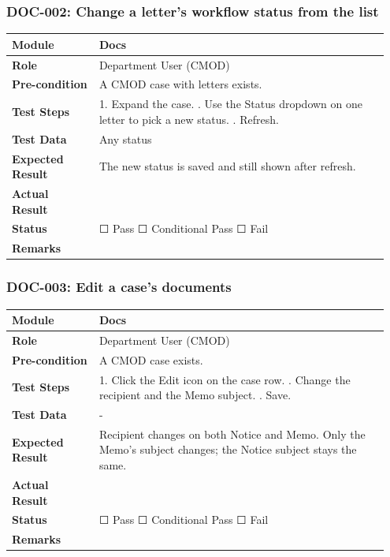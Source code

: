 \documentclass[10pt]{article}
\begin{document}
\subsubsection*{DOC-002: Change a letter's workflow status from the list}
\begin{longtable}{p{0.22\linewidth}p{0.73\linewidth}}
\hline
\textbf{Module} & Docs \\ \hline
\textbf{Role} & Department User (CMOD) \\ \hline
\textbf{Pre-condition} & A CMOD case with letters exists. \\ \hline
\textbf{Test Steps} & 1. Expand the case. \newline 2. Use the Status dropdown on one letter to pick a new status. \newline 3. Refresh. \\ \hline
\textbf{Test Data} & Any status \\ \hline
\textbf{Expected Result} & The new status is saved and still shown after refresh. \\ \hline
\textbf{Actual Result} & \newline \newline \\ \hline
\textbf{Status} & ☐ Pass \quad ☐ Conditional Pass \quad ☐ Fail \\ \hline
\textbf{Remarks} & \newline \\ \hline
\end{longtable}
\subsubsection*{DOC-003: Edit a case's documents}
\begin{longtable}{p{0.22\linewidth}p{0.73\linewidth}}
\hline
\textbf{Module} & Docs \\ \hline
\textbf{Role} & Department User (CMOD) \\ \hline
\textbf{Pre-condition} & A CMOD case exists. \\ \hline
\textbf{Test Steps} & 1. Click the Edit icon on the case row. \newline 2. Change the recipient and the Memo subject. \newline 3. Save. \\ \hline
\textbf{Test Data} & - \\ \hline
\textbf{Expected Result} & Recipient changes on both Notice and Memo. Only the Memo's subject changes; the Notice subject stays the same. \\ \hline
\textbf{Actual Result} & \newline \newline \\ \hline
\textbf{Status} & ☐ Pass \quad ☐ Conditional Pass \quad ☐ Fail \\ \hline
\textbf{Remarks} & \newline \\ \hline
\end{longtable}
\end{document}
